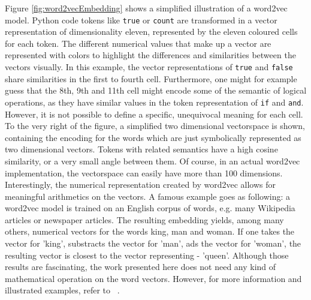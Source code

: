 \documentclass[
	a4paper,
	pagesize,
	pdftex,
	12pt,
	twoside, %
	BCOR=5mm, %
	ngerman,
	fleqn,
	final,
	]{scrartcl}
\begin{document}
Figure \ref{fig:word2vecEmbedding} shows a simplified illustration of a word2vec model. Python code tokens like \texttt{true} or \texttt{count} are transformed in a vector representation of dimensionality eleven, represented by the eleven coloured cells for each token. The different numerical values that make up a vector are represented with colors to highlight the differences and similarities between the vectors visually. In this example, the vector representations of \texttt{true} and \texttt{false} share similarities in the first to fourth cell. Furthermore, one might for example guess that the 8th, 9th and 11th cell might encode some of the semantic of logical operations, as they have similar values in the token representation of \texttt{if} and \texttt{and}. However, it is not possible to define a specific, unequivocal meaning for each cell.\\
To the very right of the figure, a simplified two dimensional vectorspace is shown, containing the encoding for the words which are just symbolically represented as two dimensional vectors. Tokens with related semantics have a high cosine similarity, or a very small angle between them. Of course, in an actual word2vec implementation, the vectorspace can easily have more than 100 dimensions.\\
Interestingly, the numerical representation created by word2vec allows for meaningful arithmetics on the vectors. A famous example goes as following: a word2vec model is trained on an English corpus of words, e.g. many Wikipedia articles or newspaper articles. The resulting embedding yields, among many others, numerical vectors for the words king, man and woman. If one takes the vector for 'king', substracts the vector for 'man', ads the vector for 'woman', the resulting vector is closest to the vector representing - 'queen'. Although those results are fascinating, the work presented here does not need any kind of mathematical operation on the word vectors. However, for more information and illustrated examples, refer to ~\cite{Word2Vec}.
\end{document}
